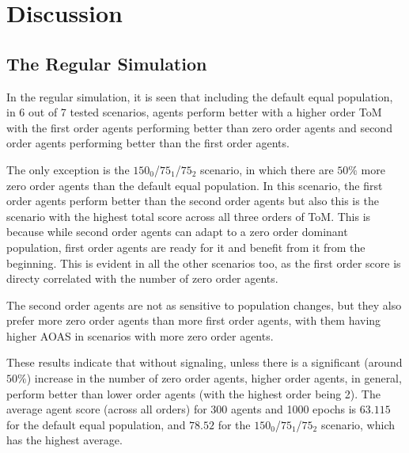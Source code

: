 \section{Discussion}\label{sec:discussion}

\subsection{The Regular Simulation}

In the regular simulation, it is seen that including the default equal population, in 6 out of 7 tested scenarios, agents perform better with a higher order ToM with the first order agents performing better than zero order agents and second order agents performing better than the first order agents. 

The only exception is the $150_{0}$/$75_{1}$/$75_{2}$ scenario, in which there are $50\%$ more zero order agents than the default equal population. In this scenario, the first order agents perform better than the second order agents but also this is the scenario with the highest total score across all three orders of ToM. This is because while second order agents can adapt to a zero order dominant population, first order agents are ready for it and benefit from it from the beginning. This is evident in all the other scenarios too, as the first order score is directy correlated with the number of zero order agents. 

The second order agents are not as sensitive to population changes, but they also prefer more zero order agents than more first order agents, with them having higher AOAS in scenarios with more zero order agents.

These results indicate that without signaling, unless there is a significant (around $50\%$) increase in the number of zero order agents, higher order agents, in general, perform better than lower order agents (with the highest order being 2). The average agent score (across all orders) for 300 agents and 1000 epochs is $\mathbf{63.115
}$ for the default equal population, and $\mathbf{78.52}$ for the $150_{0}$/$75_{1}$/$75_{2}$ scenario, which has the highest average.

